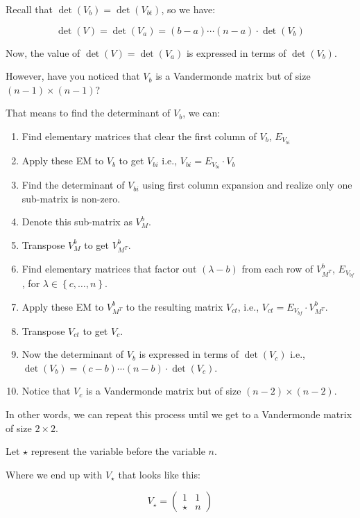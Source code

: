 \documentclass{report}
\begin{document}
{Recall that \(\det(V_{b}) = \det(V_{bt})\), so we have:

\[
	\det(V) = \det(V_{a}) = (b - a) \cdots (n - a) \cdot \det(V_{b})
\]

Now, the value of \(\det(V) = \det(V_{a})\) is expressed in terms of \(\det(V_{b})\).

However, have you noticed that \(V_{b}\) is a Vandermonde matrix but of size \((n - 1) \times (n - 1)\)?

That means to find the determinant of \(V_{b}\), we can:

\begin{enumerate}
	\item Find elementary matrices that clear the first column of \(V_{b}\), \(E_{V_{bi}}\)
	\item Apply these EM to \(V_{b}\) to get \(V_{bi}\) i.e., \(V_{bi} = E_{V_{bi}} \cdot V_{b}\)
	\item Find the determinant of \(V_{bi}\) using first column expansion and realize only one sub-matrix is non-zero.
	\item Denote this sub-matrix as \(V^{b}_{M}\).
	\item Transpose \(V^{b}_{M}\) to get \(V^{b}_{M^{T}}\).
	\item Find elementary matrices that factor out \((\lambda - b)\) from each row of \(V^{b}_{M^{T}}\), \(E_{V_{bf}}\), for \(\lambda \in \left\{ c, \ldots, n \right\}\).
	\item Apply these EM to \(V^{b}_{M^{T}}\) to the resulting matrix \(V_{ct}\), i.e., \(V_{ct} = E_{V_{bf}} \cdot V^{b}_{M^{T}}\).
	\item Transpose \(V_{ct}\) to get \(V_{c}\).
	\item Now the determinant of \(V_{b}\) is expressed in terms of \(\det(V_{c})\) i.e., \(\det(V_{b}) = (c - b) \cdots (n - b) \cdot \det(V_{c})\).
	\item Notice that \(V_{c}\) is a Vandermonde matrix but of size \((n - 2) \times (n - 2)\).
\end{enumerate}

In other words, we can repeat this process until we get to a Vandermonde matrix of size \(2 \times 2\).

Let \(\star\) represent the variable before the variable \(n\).

Where we end up with \(V_{\star}\) that looks like this:

\[
	V_{\star} = \begin{pmatrix} 1 & 1 \\ \star & n \end{pmatrix}
\]

}
\end{document}
